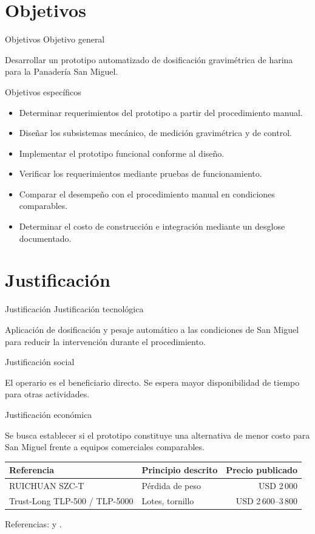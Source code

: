 \documentclass[aspectratio=169,spanish]{beamer}
\newcommand{\fuente}[1]{\par\vfill{\scriptsize #1}}
\begin{document}
\section{Objetivos}
\begin{frame}{Objetivos}
\relax
{\large\color{UCBBlue}Objetivo general}
\par\smallskip
Desarrollar un prototipo automatizado de dosificación gravimétrica de harina para la Panadería San Miguel.
\par\medskip
{\large\color{UCBBlue}Objetivos específicos}
\begin{itemize}\small
\setlength{\itemsep}{0.10cm}
\item Determinar requerimientos del prototipo a partir del procedimiento manual.
\item Diseñar los subsistemas mecánico, de medición gravimétrica y de control.
\item Implementar el prototipo funcional conforme al diseño.
\item Verificar los requerimientos mediante pruebas de funcionamiento.
\item Comparar el desempeño con el procedimiento manual en condiciones comparables.
\item Determinar el costo de construcción e integración mediante un desglose documentado.
\end{itemize}
\end{frame}

\section{Justificación}
\begin{frame}{Justificación}
\relax
{\large\color{UCBBlue}Justificación tecnológica}
\par\smallskip
{\small Aplicación de dosificación y pesaje automático a las condiciones de San Miguel
para reducir la intervención durante el procedimiento.}
\par\smallskip
{\large\color{UCBBlue}Justificación social}
\par\smallskip
{\small El operario es el beneficiario directo. Se espera mayor disponibilidad de
tiempo para otras actividades.}
\par\smallskip
{\large\color{UCBBlue}Justificación económica}
\par\smallskip
{\small Se busca establecer si el prototipo constituye una alternativa de menor costo
para San Miguel frente a equipos comerciales comparables.}
\par\smallskip
{\centering\footnotesize\renewcommand{\arraystretch}{1.0}
\begin{tabular}{@{}llr@{}}
\toprule
\textbf{Referencia} & \textbf{Principio descrito} & \textbf{Precio publicado}\\
\midrule
RUICHUAN SZC-T & Pérdida de peso & USD 2\,000\\
Trust-Long TLP-500 / TLP-5000 & Lotes, tornillo & USD 2\,600--3\,800\\
\bottomrule
\end{tabular}\par}
\fuente{Referencias: \textcite{UnidadDosificadoraGravimetrica} y \textcite{MaquinaLlenadoPolvo}.}
\end{frame}
\end{document}
